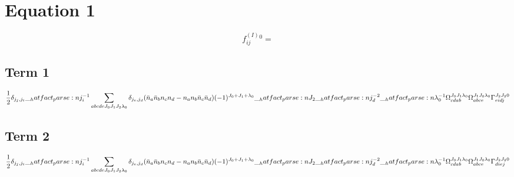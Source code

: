 \documentclass{scrartcl}
\begin{document}
\section{Equation 1}
\begin{dmath*}
f^{(I)}_{i j}^{0} = 
\end{dmath*}
\subsection{Term 1}
\begin{dmath*}
\frac{1}{2} \* \delta_{{j}_{j},{j}_{i}} \* \hatfact{{j}_{i}^{-1}} \* \sum_{a b c d e {J}_{0} {J}_{1} {J}_{2} {{\lambda}}_{0}} \* \delta_{{j}_{e},{j}_{d}} \* (\bar{n}_{a} \* \bar{n}_{b} \* n_{c} \* n_{d} -n_{a} \* n_{b} \* \bar{n}_{c} \* \bar{n}_{d}) \* (-1)^{{J}_{0}+{J}_{1}+{{\lambda}}_{0}} \* \hatfact{{J}_{2}} \* \hatfact{{j}_{d}^{-2}} \* \hatfact{{{\lambda}}_{0}^{-1}} \* \Omega_{c d a b}^{{J}_{0} {J}_{1} {{\lambda}}_{0}} \* \Omega_{a b c e}^{{J}_{1} {J}_{0} {{\lambda}}_{0}} \* \Gamma_{e i d j}^{{J}_{2} {J}_{2} 0}
\end{dmath*}
\subsection{Term 2}
\begin{dmath*}
\frac{1}{2} \* \delta_{{j}_{j},{j}_{i}} \* \hatfact{{j}_{i}^{-1}} \* \sum_{a b c d e {J}_{0} {J}_{1} {J}_{2} {{\lambda}}_{0}} \* \delta_{{j}_{e},{j}_{d}} \* (\bar{n}_{a} \* \bar{n}_{b} \* n_{c} \* n_{d} -n_{a} \* n_{b} \* \bar{n}_{c} \* \bar{n}_{d}) \* (-1)^{{J}_{0}+{J}_{1}+{{\lambda}}_{0}} \* \hatfact{{J}_{2}} \* \hatfact{{j}_{d}^{-2}} \* \hatfact{{{\lambda}}_{0}^{-1}} \* \Omega_{c d a b}^{{J}_{0} {J}_{1} {{\lambda}}_{0}} \* \Omega_{a b c e}^{{J}_{1} {J}_{0} {{\lambda}}_{0}} \* \Gamma_{d i e j}^{{J}_{2} {J}_{2} 0}
\end{dmath*}
\end{document}
